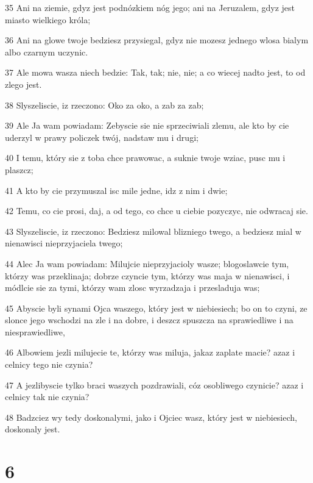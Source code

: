 \par 35 Ani na ziemie, gdyz jest podnózkiem nóg jego; ani na Jeruzalem, gdyz jest miasto wielkiego króla;
\par 36 Ani na glowe twoje bedziesz przysiegal, gdyz nie mozesz jednego wlosa bialym albo czarnym uczynic.
\par 37 Ale mowa wasza niech bedzie: Tak, tak; nie, nie; a co wiecej nadto jest, to od zlego jest.
\par 38 Slyszeliscie, iz rzeczono: Oko za oko, a zab za zab;
\par 39 Ale Ja wam powiadam: Zebyscie sie nie sprzeciwiali zlemu, ale kto by cie uderzyl w prawy policzek twój, nadstaw mu i drugi;
\par 40 I temu, który sie z toba chce prawowac, a suknie twoje wziac, pusc mu i plaszcz;
\par 41 A kto by cie przymuszal isc mile jedne, idz z nim i dwie;
\par 42 Temu, co cie prosi, daj, a od tego, co chce u ciebie pozyczyc, nie odwracaj sie.
\par 43 Slyszeliscie, iz rzeczono: Bedziesz milowal blizniego twego, a bedziesz mial w nienawisci nieprzyjaciela twego;
\par 44 Alec Ja wam powiadam: Milujcie nieprzyjacioly wasze; blogoslawcie tym, którzy was przeklinaja; dobrze czyncie tym, którzy was maja w nienawisci, i módlcie sie za tymi, którzy wam zlosc wyrzadzaja i przesladuja was;
\par 45 Abyscie byli synami Ojca waszego, który jest w niebiesiech; bo on to czyni, ze slonce jego wschodzi na zle i na dobre, i deszcz spuszcza na sprawiedliwe i na niesprawiedliwe,
\par 46 Albowiem jezli milujecie te, którzy was miluja, jakaz zaplate macie? azaz i celnicy tego nie czynia?
\par 47 A jezlibyscie tylko braci waszych pozdrawiali, cóz osobliwego czynicie? azaz i celnicy tak nie czynia?
\par 48 Badzciez wy tedy doskonalymi, jako i Ojciec wasz, który jest w niebiesiech, doskonaly jest.

\chapter{6}

